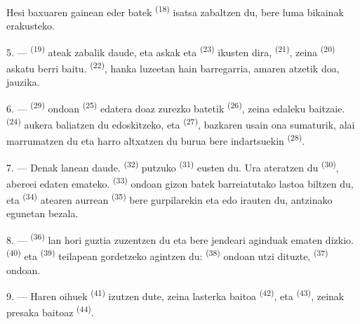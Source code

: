 Hesi baxuaren gainean  eder batek \textsuperscript{(18)} isatsa
zabaltzen du, bere luma bikainak erakusteko.

\VUsaut{3.0mm}

5. ---  \textsuperscript{(19)} ateak zabalik daude, eta
askak eta  \textsuperscript{(23)} ikusten dira,
 \textsuperscript{(21)}, zeina 
\textsuperscript{(20)} askatu berri baitu. 
\textsuperscript{(22)}, hanka luzeetan hain barregarria, amaren atzetik doa,
jauzika.

6. ---  \textsuperscript{(29)} ondoan 
\textsuperscript{(25)} edatera doaz zurezko  batetik
\textsuperscript{(26)}, zeina edaleku baitzaie. 
\textsuperscript{(24)} aukera baliatzen du edoskitzeko, eta 
\textsuperscript{(27)}, bazkaren usain ona sumaturik, alai marrumatzen du eta
harro altxatzen du burua bere  indartsuekin \textsuperscript{(28)}.

7. --- Denak lanean daude.  \textsuperscript{(32)}
putzuko  \textsuperscript{(31)} eusten du. Ura ateratzen du
 \textsuperscript{(30)}, abereei edaten emateko.
 \textsuperscript{(33)} ondoan gizon batek barreiatutako
lastoa biltzen du, eta  \textsuperscript{(34)} atearen
aurrean  \textsuperscript{(35)} bere gurpilarekin eta
  edo  irauten du, antzinako
egunetan bezala.

\VUsaut{3.0mm}
\VUsaut{3.0mm}

8. ---  \textsuperscript{(36)} lan hori guztia zuzentzen du
eta bere jendeari aginduak ematen dizkio. 
\textsuperscript{(40)} eta  \textsuperscript{(39)} teilapean
gordetzeko agintzen du:  \textsuperscript{(38)} ondoan utzi
dituzte,  \textsuperscript{(37)} ondoan.

9. --- Haren oihuek  \textsuperscript{(41)} izutzen dute, zeina
lasterka baitoa  \textsuperscript{(42)}, eta 
\textsuperscript{(43)}, zeinak presaka baitoaz 
\textsuperscript{(44)}.

